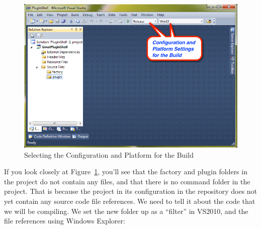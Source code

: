 \documentclass[10pt,letterpaper]{article}
\begin{document}
\begin{figure}[htb]
\begin{center}
\includegraphics[scale=.5]{images/VS2010BuildSettings.png}
\caption{\label{VS2010PlatformSettings}Selecting the Configuration and Platform for the Build}
\end{center}
\end{figure} 

If you look closely at Figure~\ref{VS2010PlatformSettings}, you'll see that the factory and plugin folders in the project do not contain any files, and that there is no command folder in the project.  That is because the project in its configuration in the repository does not yet contain any source code file references.  We need to tell it about the code that we will be compiling.  We set the new folder up as a ``filter'' in VS2010, and the file references using Windows Explorer:
\end{document}
